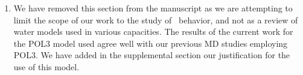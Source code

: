 \documentclass{article}
\begin{document}
\begin{enumerate}
\item We have removed this section from the manuscript as we are attempting to limit the scope of our work to the study of \suldiox~behavior, and not as a review of water models used in various capacities. The results of the current work for the POL3 model used agree well with our previous MD studies employing POL3. We have added in the supplemental section our justification for the use of this model.

\end{enumerate}
\end{document}

